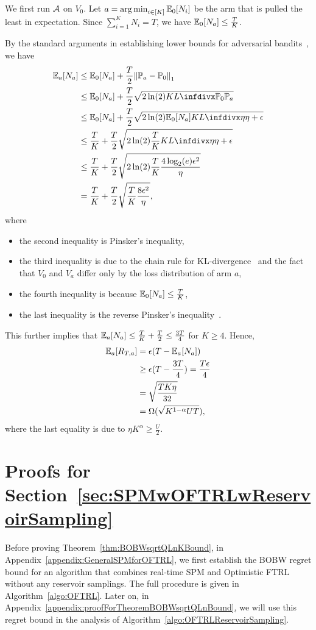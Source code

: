 We first run ${\mathcal{A}}$ on $V_0$. 
Let $a = \operatorname*{arg\,min}_{i \in [K]} \mathbb{E}_0[N_i]$ be the arm that is pulled the least in expectation. Since $\sum_{i=1}^K N_i = T$, we have $\mathbb{E}_0[N_a] \leq \frac{T}{K}$.

By the standard arguments in establishing lower bounds for adversarial bandits~\citep[e.g.][Equation 28-30]{Auer2002a}, we have 
\begin{align*}
    \E_a[N_a] &\leq \E_0[N_a] + \frac{T}{2}\norm{\P_a - \P_0}_1 \\
    &\leq \E_0[N_a] + \frac{T}{2}\sqrt{2\ln(2)\infdiv{\P_0}{\P_a} } \\
    &\leq \E_0[N_a] + \frac{T}{2}\sqrt{2\ln(2)\E_0[N_a]\infdiv{\eta}{\eta + \eps} } \\
    &\leq \frac{T}{K} + \frac{T}{2}\sqrt{2\ln(2)\frac{T}{K}\infdiv{\eta}{\eta + \eps} } \\
    &\leq \frac{T}{K} + \frac{T}{2}\sqrt{2\ln(2)\frac{T}{K}\frac{4\log_2(e) \eps^2}{\eta} } \\
    &= \frac{T}{K} + \frac{T}{2}\sqrt{\frac{T}{K}\frac{8\eps^2}{\eta} } ,
\end{align*}
where
\begin{itemize}
    \item the second inequality is Pinsker's inequality,
    \item the third inequality is due to the chain rule for KL-divergence~\citep{CoverAndThomas2006} and the fact that $V_0$ and $V_a$ differ only by the loss distribution of arm $a$,
    \item the fourth inequality is because $\mathbb{E}_0[N_a] \leq \frac{T}{K}$,
    \item the last inequality is the reverse Pinsker's inequality~\citep{sason2015reverse}.
\end{itemize}
This further implies that $\mathbb{E}_a[N_a] \leq \frac{T}{K} + \frac{T}{2} \leq \frac{3T}{4}$ for $K \geq 4$. Hence,
\begin{align*}
    \mathbb{E}_a[R_{T,a}] &= {\epsilon} (T - \mathbb{E}_a[N_a]) \\
    &\geq {\epsilon} (T - \frac{3T}{4}) = \frac{T{\epsilon}}{4} \\
    &= \sqrt{\frac{TK\eta}{32}} \\
    &= \Omega(\sqrt{K^{1-\alpha}UT}),
\end{align*}
where the last equality is due to $\eta K^\alpha \geq \frac{U}{2}$.

\section{Proofs for Section~\ref{sec:SPMwOFTRLwReservoirSampling}}
\label{appendix:proofsforSectionOFTRLReservoirSampling}
Before proving Theorem~\ref{thm:BOBWsqrtQLnKBound}, in Appendix~\ref{appendix:GeneralSPMforOFTRL}, we first establish the BOBW regret bound for an algorithm that combines real-time SPM and Optimistic FTRL without any reservoir samplings. 
The full procedure is given in Algorithm~\ref{algo:OFTRL}.
Later on, in Appendix~\ref{appendix:proofForTheoremBOBWsqrtQLnBound}, we will use this regret bound in the analysis of Algorithm~\ref{algo:OFTRLReservoirSampling}.

